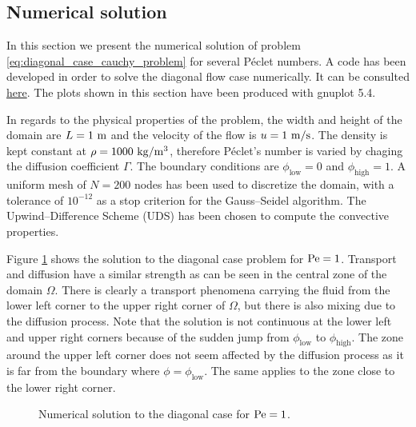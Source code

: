 
\subsection{Numerical solution}

In this section we present the numerical solution of problem
\eqref{eq:diagonal_case_cauchy_problem} for several Péclet numbers. A \CC code
has been developed in order to solve the diagonal flow case numerically. It can
be consulted
\href{https://github.com/plosan/convection_diffusion_equations}{here}.
The plots shown in this section have been produced with gnuplot 5.4. 

In regards to the physical properties of the problem, the width and height of
the domain are $L = 1 \ \meter$ and the velocity of the flow is $u = 1 \ \meter
/ \second$. The density is kept constant at $\rho = 1000 \ \kilo\gram /
\meter^3$, therefore Péclet's number is varied by chaging the diffusion
coefficient $\Gamma$. The boundary conditions are $\phi_\text{low} = 0$ and
$\phi_\text{high} = 1$. A uniform mesh of $N = 200$ nodes has been used to
discretize the domain, with a tolerance of $10^{-12}$ as a stop criterion for
the Gauss--Seidel algorithm. The Upwind--Difference Scheme (UDS) has been chosen
to compute the convective properties.

Figure \ref{fig:diagonal_N200_Pe1.0e+00} shows the solution to the diagonal case
problem for $\peclet = 1$. Transport and diffusion have a similar strength as
can be seen in the central zone of the domain $\Omega$. There is clearly a
transport phenomena carrying the fluid from the lower left corner to the upper
right corner of $\Omega$, but there is also mixing due to the diffusion process.
Note that the solution is not continuous at the lower left and upper right
corners because of the sudden jump from $\phi_\text{low}$ to $\phi_\text{high}$.
The zone around the upper left corner does not seem affected by the diffusion
process as it is far from the boundary where $\phi = \phi_\text{low}$. The same
applies to the zone close to the lower right corner.

\begin{figure}[h]
	\centering
	\vspace{-0.75cm}
	
	\vspace{-0.50cm}
	\caption{Numerical solution to the diagonal case for $\peclet = 1$.}
	\label{fig:diagonal_N200_Pe1.0e+00}
\end{figure}

